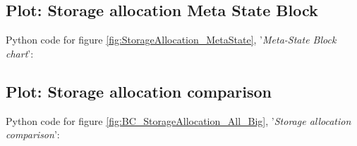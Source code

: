 \subsection{Plot: Storage allocation Meta State Block}
\label{script:StorageAllocationMetaState}
Python code for figure \ref{fig:StorageAllocation_MetaState}, '\textit{Meta-State Block chart}':
\pagebreak

\subsection{Plot: Storage allocation comparison}
\label{script:StorageAllocationComp}
Python code for figure \ref{fig:BC_StorageAllocation_All_Big}, '\textit{Storage allocation comparison}':

